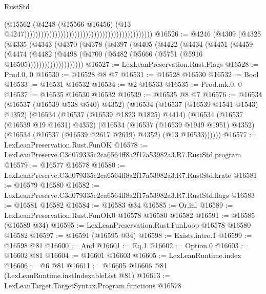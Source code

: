 \begin{lexlean}{RustStd}
\begin{coremodule}
                                                                                          (@15562
                                                                                            (@4248
                                                                                              (@15566
                                                                                                @16456)
                                                                                              (@13
                                                                                                @4247))))))))))))))))))))))))))))))))))))))))))))))
@16526 := @4246
    (@4309
      (@4325
        (@4335
          (@4343
            (@4370
              (@4378
                (@4397
                  (@4405
                    (@4422
                      (@4434
                        (@4451
                          (@4459
                            (@4474
                              (@4482
                                (@4498 (@4700 (@5482 (@5666 (@5751 (@5916 @16505))))))))))))))))))))
@16527 := LexLeanPreservation.Rust.Flags
@16528 := Prod.{0, 0}
@16530 := @16528 @8 @7
@16531 := @16528 @16530
@16532 := Bool
@16533 := @16531 @16532
@16534 := @2 @16533
@16535 := Prod.mk.{0, 0}
@16537 := @16535 @16530 @16532
@16539 := @16535 @8 @7
@16576 := @16534
    (@16537 (@16539 @538 @540) @4352)
    (@16534
      (@16537 (@16539 @1541 @1543) @4352)
      (@16534
        (@16537 (@16539 @1823 @1825) @4414)
        (@16534
          (@16537 (@16539 @19 @1631) @4352)
          (@16534
            (@16537 (@16539 @1949 @1951) @4352)
            (@16534 (@16537 (@16539 @2617 @2619) @4352) (@13 @16533))))))
@16577 := LexLeanPreservation.Rust.FunOK
@16578 := LexLeanPreserve.C3d079335c2ca6564ff8a2f17a53982a3.R7.RustStd.program
@16579 := @16577 @16578
@16580 := LexLeanPreserve.C3d079335c2ca6564ff8a2f17a53982a3.R7.RustStd.krate
@16581 := @16579 @16580
@16582 := LexLeanPreserve.C3d079335c2ca6564ff8a2f17a53982a3.R7.RustStd.flags
@16583 := @16581 @16582
@16584 := @16583 @34
@16585 := Or.inl
@16589 := LexLeanPreservation.Rust.FunOK0 @16578 @16580 @16582
@16591 := @16585 (@16589 @34)
@16595 := LexLeanPreservation.Rust.FunLoop @16578 @16580 @16582
@16597 := @16591 (@16595 @34)
@16598 := Exists.intro.{1}
@16599 := @16598 @81
@16600 := And
@16601 := Eq.{1}
@16602 := Option.{0}
@16603 := @16602 @81
@16604 := @16601 @16603
@16605 := LexLeanRuntime.index
@16606 := @6 @81
@16611 := @16605 @16606 @81 (LexLeanRuntime.instIndexableList @81)
@16613 := LexLeanTarget.TargetSyntax.Program.functions @16578

\end{coremodule}
\end{lexlean}

